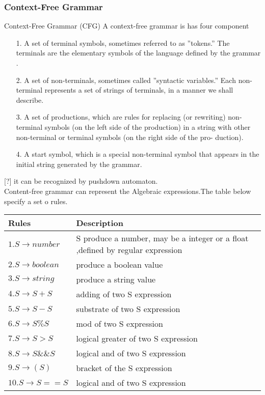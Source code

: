 \subsubsection{Context-Free Grammar}
Context-Free Grammar (CFG)
A context-free grammar is has four component
\begin{itemize}
\item [1.] A set of terminal symbols, sometimes referred to as ”tokens.” The
terminals are the elementary symbols of the language defined by the
grammar .
\item [2.] A set of non-terminals, sometimes called ”syntactic variables.” Each
non- terminal represents a set of strings of terminals, in a manner we
shall describe.
\item [3.] A set of productions, which are rules for replacing (or rewriting) non-
terminal symbols (on the left side of the production) in a string with
other non-terminal or terminal symbols (on the right side of the pro-
duction).
\item [4.] A start symbol, which is a special non-terminal symbol that appears in the initial string generated by the grammar.
\end{itemize}
[?] it can be recognized by pushdown automaton.\\

Content-free grammar can represent the Algebraic expressions.The table below specify a set o rules. 

\begin{tabular}{|p{6cm}|p{6cm}|}
\hline \textbf{Rules} & \textbf{Description}\\ 
\hline  $1. S \rightarrow number $ & S produce a number, may be a integer or a float ,defined by regular expression  \\ 
\hline  $2.  S \rightarrow boolean $ &  produce a boolean value \\ 
\hline  $3. S \rightarrow string $&  produce a string value \\ 
\hline  $4.S \rightarrow S+S $&  adding of two S expression\\ 
\hline  $5.S \rightarrow S-S $ &  substrate of two S expression\\
\hline $6.S\rightarrow S \%S $ & mod of two S expression \\
\hline $7. S\rightarrow S > S $ &  logical greater  of two S expression\\
\hline $8.S \rightarrow S \&\& S $ & logical and of two S expression \\
\hline $9.S \rightarrow ( S) $ &  bracket of the S expression\\
\hline $10.S \rightarrow S == S $ & logical and of two S expression \\
\hline 
\end{tabular} 

